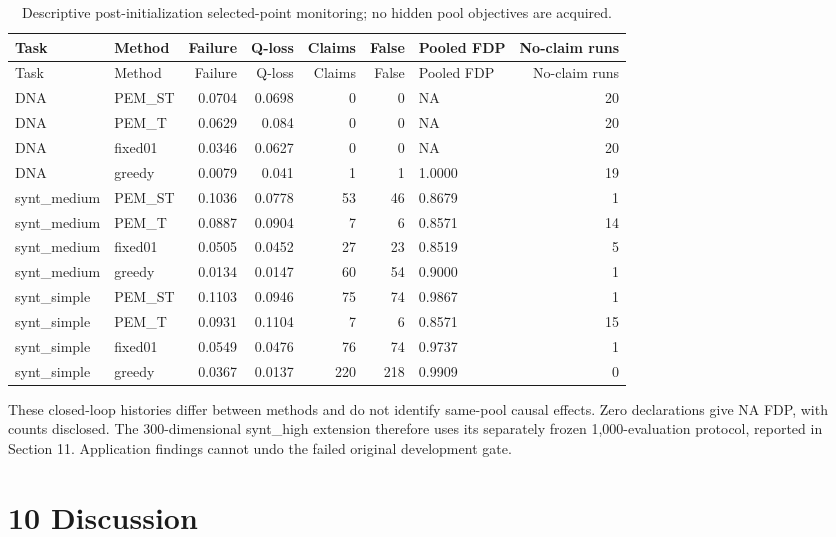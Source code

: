 \documentclass[11pt,a4paper]{article}
\begin{document}
\par\noindent\begin{minipage}{\linewidth}

\begin{longtable}[]{@{}llrrrrlr@{}}
\caption{Descriptive post-initialization selected-point monitoring; no
hidden pool objectives are acquired.}\tabularnewline
\toprule
Task & Method & Failure & Q-loss & Claims & False & Pooled FDP &
No-claim runs \\
\midrule
\endfirsthead
\toprule
Task & Method & Failure & Q-loss & Claims & False & Pooled FDP &
No-claim runs \\
\midrule
\endhead
DNA & PEM\_ST & 0.0704 & 0.0698 & 0 & 0 & NA & 20 \\
DNA & PEM\_T & 0.0629 & 0.084 & 0 & 0 & NA & 20 \\
DNA & fixed01 & 0.0346 & 0.0627 & 0 & 0 & NA & 20 \\
DNA & greedy & 0.0079 & 0.041 & 1 & 1 & 1.0000 & 19 \\
synt\_medium & PEM\_ST & 0.1036 & 0.0778 & 53 & 46 & 0.8679 & 1 \\
synt\_medium & PEM\_T & 0.0887 & 0.0904 & 7 & 6 & 0.8571 & 14 \\
synt\_medium & fixed01 & 0.0505 & 0.0452 & 27 & 23 & 0.8519 & 5 \\
synt\_medium & greedy & 0.0134 & 0.0147 & 60 & 54 & 0.9000 & 1 \\
synt\_simple & PEM\_ST & 0.1103 & 0.0946 & 75 & 74 & 0.9867 & 1 \\
synt\_simple & PEM\_T & 0.0931 & 0.1104 & 7 & 6 & 0.8571 & 15 \\
synt\_simple & fixed01 & 0.0549 & 0.0476 & 76 & 74 & 0.9737 & 1 \\
synt\_simple & greedy & 0.0367 & 0.0137 & 220 & 218 & 0.9909 & 0 \\
\bottomrule
\end{longtable}

\end{minipage}\par

These closed-loop histories differ between methods and do not identify
same-pool causal effects. Zero declarations give NA FDP, with counts
disclosed. The 300-dimensional synt\_high extension therefore uses its
separately frozen 1,000-evaluation protocol, reported in Section 11.
Application findings cannot undo the failed original development gate.

\hypertarget{discussion}{%
\section{10 Discussion}\label{discussion}}
\end{document}

